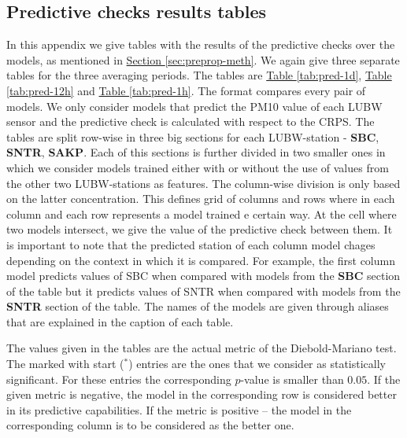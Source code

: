\documentclass[12pt,a4paper,twoside]{scrartcl}
\numberwithin{equation}{section}
\newcommand{\refsec}[1]{\hyperref[#1]{Section \ref*{#1}}}
\newcommand{\reftab}[1]{\hyperref[#1]{Table \ref*{#1}}}
\newcounter{mypagecount}%
\newenvironment{interlude}{%
  \clearpage
  \setcounter{mypagecount}{\value{page}}%
  \thispagestyle{empty}%
  \pagestyle{empty}%
}{%
  \clearpage
  \setcounter{page}{\value{mypagecount}}%
}
\let\chapter=\section %
\begin{document}
\begin{interlude}
\begin{appendices}
    \chapter{Predictive checks results tables}
    In this appendix we give tables with the results of the predictive checks over the models, as mentioned in \refsec{sec:preprop-meth}. We again give three separate tables for the three averaging periods. The tables are \reftab{tab:pred-1d}, \reftab{tab:pred-12h} and \reftab{tab:pred-1h}. The format compares every pair of models. We only consider models that predict the PM10 value of each LUBW sensor and the predictive check is calculated with respect to the CRPS. 
    The tables are split row-wise in three big sections for each LUBW-station - \textbf{SBC}, \textbf{SNTR}, \textbf{SAKP}. Each of this sections is further divided in two smaller ones in which we consider models trained either with or without the use of values from the other two LUBW-stations as features. The column-wise division is only based on the latter concentration. This defines grid of columns and rows where in each column and each row represents a model trained e certain way. At the cell where two models intersect, we give the value of the predictive check between them. It is important to note that the predicted station of each column model chages depending on the context in which it is compared. For example, the first column model predicts values of SBC when compared with models from the \textbf{SBC} section of the table but it predicts values of SNTR when compared with models from the \textbf{SNTR} section of the table. The names of the models are given through aliases that are explained in the caption of each table.
    
    The values given in the tables are the actual metric of the Diebold-Mariano test. The marked with start (\(^* \)) entries are the ones that we consider as statistically significant. For these entries the corresponding \(p\)-value is smaller than \(0.05\). If the given metric is negative, the model in the corresponding row is considered better in its predictive capabilities. If the metric is positive -- the model in the corresponding column is to be considered as the better one.
    \begin{table}
      \centering
      \label{tab:pred-1d}
    \end{table}
    \begin{table}
      \centering
      \label{tab:pred-12h}
    \end{table}
    \begin{table}
      \centering
      \label{tab:pred-1h}
    \end{table}


\end{appendices}
\end{interlude}
\end{document}
